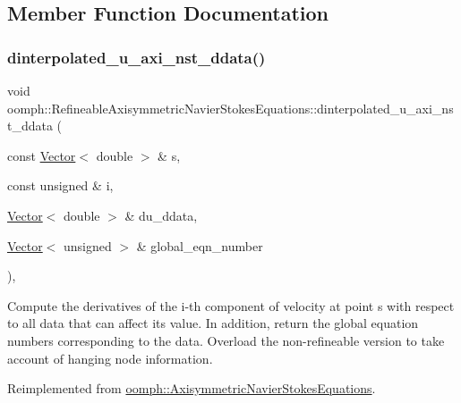 \subsection{Member Function Documentation}
\mbox{\label{classoomph_1_1RefineableAxisymmetricNavierStokesEquations_ac1a49ddb1942c4ee2d5cacb94b1c9251}} 
\subsubsection{\texorpdfstring{dinterpolated\+\_\+u\+\_\+axi\+\_\+nst\+\_\+ddata()}{dinterpolated\_u\_axi\_nst\_ddata()}}
{\footnotesize\ttfamily void oomph\+::\+Refineable\+Axisymmetric\+Navier\+Stokes\+Equations\+::dinterpolated\+\_\+u\+\_\+axi\+\_\+nst\+\_\+ddata (\begin{DoxyParamCaption}\item[{const \hyperlink{classoomph_1_1Vector}{Vector}$<$ double $>$ \&}]{s,  }\item[{const unsigned \&}]{i,  }\item[{\hyperlink{classoomph_1_1Vector}{Vector}$<$ double $>$ \&}]{du\+\_\+ddata,  }\item[{\hyperlink{classoomph_1_1Vector}{Vector}$<$ unsigned $>$ \&}]{global\+\_\+eqn\+\_\+number }\end{DoxyParamCaption})\hspace{0.3cm}{\ttfamily [inline]}, {\ttfamily [virtual]}}



Compute the derivatives of the i-\/th component of velocity at point s with respect to all data that can affect its value. In addition, return the global equation numbers corresponding to the data. Overload the non-\/refineable version to take account of hanging node information. 



Reimplemented from \hyperlink{classoomph_1_1AxisymmetricNavierStokesEquations_ac2104aa72b43d60bb3fd20d63eab7844}{oomph\+::\+Axisymmetric\+Navier\+Stokes\+Equations}.



